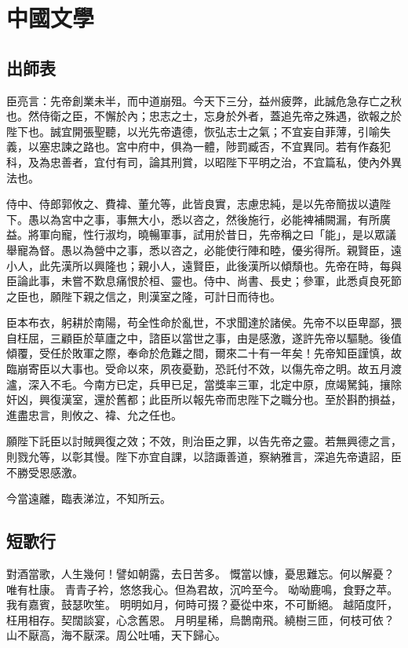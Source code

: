 
\chapter{中國文學}

\begin{tempsection}

\section{出師表}

臣亮言：先帝創業未半，而中道崩殂。今天下三分，益州疲弊，此誠危急存亡之秋也。然侍衛之臣，不懈於內；忠志之士，忘身於外者，蓋追先帝之殊遇，欲報之於陛下也。誠宜開張聖聽，以光先帝遺德，恢弘志士之氣；不宜妄自菲薄，引喻失義，以塞忠諫之路也。宮中府中，俱為一體，陟罰臧否，不宜異同。若有作姦犯科，及為忠善者，宜付有司，論其刑賞，以昭陛下平明之治，不宜篇私，使內外異法也。\par

侍中、侍郎郭攸之、費褘、董允等，此皆良實，志慮忠純，是以先帝簡拔以遺陛下。愚以為宮中之事，事無大小，悉以咨之，然後施行，必能裨補闕漏，有所廣益。將軍向寵，性行淑均，曉暢軍事，試用於昔日，先帝稱之曰「能」，是以眾議舉寵為督。愚以為營中之事，悉以咨之，必能使行陣和睦，優劣得所。親賢臣，遠小人，此先漢所以興隆也；親小人，遠賢臣，此後漢所以傾頹也。先帝在時，每與臣論此事，未嘗不歎息痛恨於桓、靈也。侍中、尚書、長史；參軍，此悉貞良死節之臣也，願陛下親之信之，則漢室之隆，可計日而待也。

臣本布衣，躬耕於南陽，苟全性命於亂世，不求聞達於諸侯。先帝不以臣卑鄙，猥自枉屈，三顧臣於草廬之中，諮臣以當世之事，由是感激，遂許先帝以驅馳。後值傾覆，受任於敗軍之際，奉命於危難之間，爾來二十有一年矣！先帝知臣謹慎，故臨崩寄臣以大事也。受命以來，夙夜憂勤，恐託付不效，以傷先帝之明。故五月渡瀘，深入不毛。今南方已定，兵甲已足，當獎率三軍，北定中原，庶竭駑鈍，攘除奸凶，興復漢室，還於舊都；此臣所以報先帝而忠陛下之職分也。至於斟酌損益，進盡忠言，則攸之、褘、允之任也。

願陛下託臣以討賊興復之效；不效，則治臣之罪，以告先帝之靈。若無興德之言，則戮允等，以彰其慢。陛下亦宜自課，以諮諏善道，察納雅言，深追先帝遺詔，臣不勝受恩感激。

今當遠離，臨表涕泣，不知所云。

\section{短歌行}

對酒當歌，人生幾何！譬如朝露，去日苦多。
慨當以慷，憂思難忘。何以解憂？唯有杜康。
青青子衿，悠悠我心。但為君故，沉吟至今。
呦呦鹿鳴，食野之苹。我有嘉賓，鼓瑟吹笙。
明明如月，何時可掇？憂從中來，不可斷絕。
越陌度阡，枉用相存。契闊談宴，心念舊恩。
月明星稀，烏鵲南飛。繞樹三匝，何枝可依？
山不厭高，海不厭深。周公吐哺，天下歸心。

\end{tempsection}